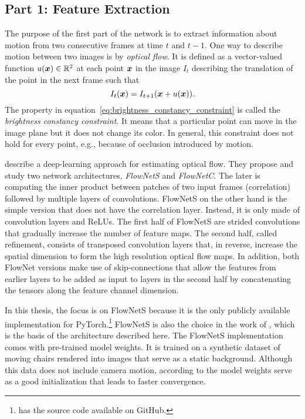 		\subsection{Part 1: Feature Extraction}
			The purpose of the first part of the network is to extract information about motion from two consecutive frames at time $t$ and $t - 1$.
			One way to describe motion between two images is by \emph{optical flow}.
			It is defined as a vector-valued function $u(\bm{x}) \in \mathbb{R}^2$ at each point $\bm{x}$ in the image $I_{t}$ describing the translation of the point in the next frame such that
			\begin{equation}\label{eq:brightness_constancy_constraint}
				I_{t}(\bm{x}) = I_{t + 1}(\bm{x} + u(\bm{x})).
			\end{equation}
			The property in equation~\ref{eq:brightness_constancy_constraint} is called the \emph{brightness constancy constraint}. 
			It means that a particular point can move in the image plane but it does not change its color.
			In general, this constraint does not hold for every point, e.g., because of occlusion introduced by motion.
			
			\cite{dosovitskiy2015flownet} describe a deep-learning approach for estimating optical flow.
			They propose and study two network architectures, \emph{FlowNetS} and \emph{FlowNetC}.
			The later is computing the inner product between patches of two input frames (correlation) followed by multiple layers of convolutions.
			FlowNetS on the other hand is the simple version that does not have the correlation layer. 
			Instead, it is only made of convolution layers and ReLUs.
			The first half of FlowNetS are strided convolutions that gradually increase the number of feature maps. 
			The second half, called refinement, consists of transposed convolution layers that, in reverse, increase the spatial dimension to form the high resolution optical flow maps.
			In addition, both FlowNet versions make use of skip-connections that allow the features from earlier layers to be added as input to layers in the second half by concatenating the tensors along the feature channel dimension. 
			
			In this thesis, the focus is on FlowNetS because it is the only publicly available implementation for PyTorch.\footnote{\citet*{flownetpytorch} has the source code available on GitHub.}
			FlowNetS is also the choice in the work of \citeauthor{wang2017deepvo}, which is the basis of the architecture described here.
			The FlowNetS implementation comes with pre-trained model weights.
			It is trained on a synthetic dataset of moving chairs rendered into images that serve as a static background.
			Although this data does not include camera motion, according to \citeauthor{wang2017deepvo} the model weights serve as a good initialization that leads to faster convergence. 
			
